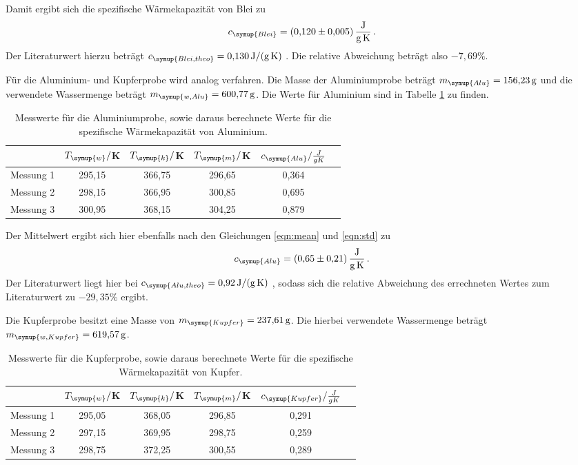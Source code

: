 Damit ergibt sich die spezifische Wärmekapazität von Blei zu
\begin{equation}
  c_{\symup{Blei}} = \SI{0.120(0005)}{\joule\per\gram\per\kelvin} \,.\nonumber
\end{equation}
Der Literaturwert hierzu beträgt $c_{\symup{Blei,theo}}=\SI{0.130}{\joule\per\gram\per\kelvin}$ \cite{werte}.
Die relative Abweichung beträgt also $-7,69\%$.

Für die Aluminium- und Kupferprobe wird analog verfahren. Die Masse der Aluminiumprobe
beträgt $m_{\symup{Alu}}=\SI{156.23}{\gram}$ und die verwendete Wassermenge
beträgt $m_{\symup{w,Alu}}=\SI{600.77}{\gram}$. Die Werte für Aluminium sind in
Tabelle \ref{tab:alu} zu finden.

\begin{table}
  \centering
  \caption{Messwerte für die Aluminiumprobe, sowie daraus berechnete Werte für die spezifische
  Wärmekapazität von Aluminium.}
  \label{tab:alu}
  \begin{tabular}{c c c c c c}
    \toprule
    & $T_{\symup{w}}/$K & $T_{\symup{k}}/$K & $T_{\symup{m}}/$K & $c_{\symup{Alu}}/\frac{J}{g K}$ \\
    \midrule
    Messung 1 & 295,15 & 366,75 & 296,65 & 0,364 \\
    Messung 2 & 298,15 & 366,95 & 300,85 & 0,695 \\
    Messung 3 & 300,95 & 368,15 & 304,25 & 0,879 \\
    \bottomrule
  \end{tabular}
\end{table}

Der Mittelwert ergibt sich hier ebenfalls nach den Gleichungen \eqref{eqn:mean} und
\eqref{eqn:std} zu
\begin{equation}
  c_{\symup{Alu}} = \SI{0.65(021)}{\joule\per\gram\per\kelvin} \,.\nonumber
\end{equation}
Der Literaturwert liegt hier bei $c_{\symup{Alu,theo}}=\SI{0.92}{\joule\per\gram\per\kelvin}$ \cite{werte},
sodass sich die relative Abweichung des errechneten Wertes zum Literaturwert zu
$-29,35\%$ ergibt.


Die Kupferprobe besitzt eine Masse von $m_{\symup{Kupfer}}=\SI{237.61}{\gram}$.
Die hierbei verwendete Wassermenge beträgt $m_{\symup{w,Kupfer}}=\SI{619.57}{\gram}$.

\begin{table}
  \centering
  \caption{Messwerte für die Kupferprobe, sowie daraus berechnete Werte für die spezifische
  Wärmekapazität von Kupfer.}
  \label{tab:kupfer}
  \begin{tabular}{c c c c c c}
    \toprule
    & $T_{\symup{w}}/$K & $T_{\symup{k}}/$K & $T_{\symup{m}}/$K & $c_{\symup{Kupfer}}/\frac{J}{g K}$ \\
    \midrule
    Messung 1 & 295,05 & 368,05 & 296,85 & 0,291 \\
    Messung 2 & 297,15 & 369,95 & 298,75 & 0,259 \\
    Messung 3 & 298,75 & 372,25 & 300,55 & 0,289 \\
    \bottomrule
  \end{tabular}
\end{table}

